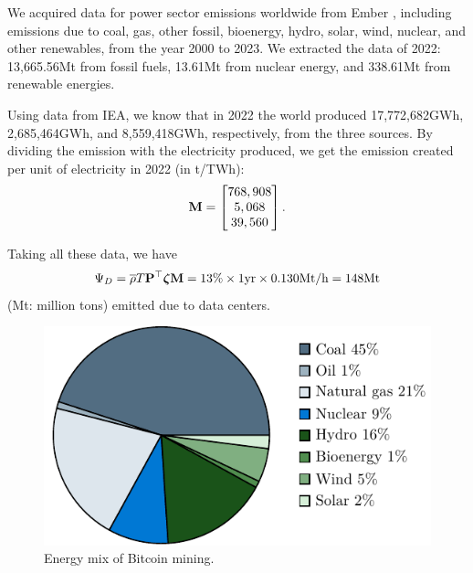\documentclass[12pt]{article}
\begin{document}
We acquired data for power sector emissions worldwide from Ember \citep{emission_dataset}, including  emissions due to coal, gas, other fossil, bioenergy, hydro, solar, wind, nuclear, and other renewables, from the year 2000 to 2023. We extracted the data of 2022: 13,665.56Mt from fossil fuels, 13.61Mt from nuclear energy, and 338.61Mt from renewable energies.

Using data from IEA, we know that in 2022 the world produced 17,772,682GWh, 2,685,464GWh, and 8,559,418GWh, respectively, from the three sources. By dividing the emission with the electricity produced, we get the  emission created per unit of electricity in 2022 (in t/TWh):
\begin{equation}
	\vb{M} = \begin{bmatrix}
		768,908 \\ 5,068 \\ 39,560
	\end{bmatrix}.
\end{equation}

Taking all these data, we have
\begin{equation}
	\Psi_D
	= \overline{\rho} T \vb{P}^\top \boldsymbol{\zeta} \vb{M}
	= 13\% \times 1 {\rm yr} \times 0.130 {\rm Mt/h} = 148 {\rm Mt}
\end{equation}
 (Mt: million tons) emitted due to data centers.

\begin{figure}[!t]
	\centering
	\includegraphics{figures/data/bitcoin_mix.pdf}
	\caption{Energy mix of Bitcoin mining.}
	\label{fig_bitcoin_mix}
\end{figure}
\end{document}

